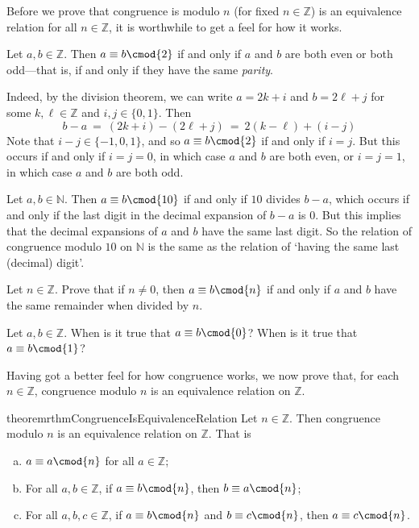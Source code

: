 Before we prove that congruence is modulo $n$ (for fixed $n \in \mathbb{Z}$) is an equivalence relation for all $n \in \mathbb{Z}$, it is worthwhile to get a feel for how it works.

\begin{example}
\label{exCongruenceModuloTwoIsSameAsParity}
Let $a,b \in \mathbb{Z}$. Then $a \equiv b \cmod{2}$ if and only if $a$ and $b$ are both even or both odd---that is, if and only if they have the same \textit{parity}.

Indeed, by the division theorem, we can write $a=2k+i$ and $b=2\ell+j$ for some $k,\ell \in \mathbb{Z}$ and $i,j \in \{ 0,1 \}$. Then
\[ b - a ~=~ (2k+i) - (2\ell+j) ~=~ 2(k-\ell) + (i-j) \]
Note that $i-j \in \{ {-1},0,1 \}$, and so $a \equiv b \cmod{2}$ if and only if $i=j$. But this occurs if and only if $i=j=0$, in which case $a$ and $b$ are both even, or $i=j=1$, in which case $a$ and $b$ are both odd.
\end{example}

\begin{example}
\label{exModuloTenIsSameAsLastDigit}
Let $a,b \in \mathbb{N}$. Then $a \equiv b \cmod{10}$ if and only if $10$ divides $b-a$, which occurs if and only if the last digit in the decimal expansion of $b-a$ is $0$. But this implies that the decimal expansions of $a$ and $b$ have the same last digit. So the relation of congruence modulo $10$ on $\mathbb{N}$ is the same as the relation of `having the same last (decimal) digit'.
\end{example}

\begin{exercise}
Let $n \in \mathbb{Z}$. Prove that if $n \ne 0$, then $a \equiv b \cmod{n}$ if and only if $a$ and $b$ have the same remainder when divided by $n$.
\end{exercise}

\begin{exercise}
Let $a,b \in \mathbb{Z}$. When is it true that $a \equiv b \cmod{0}$? When is it true that $a \equiv b \cmod{1}$?
\end{exercise}

Having got a better feel for how congruence works, we now prove that, for each $n \in \mathbb{Z}$, congruence modulo $n$ is an equivalence relation on $\mathbb{Z}$.

\begin{restatable}{theorem}{rthmCongruenceIsEquivalenceRelation}
\label{thmCongruenceIsEquivalenceRelation}
Let $n \in \mathbb{Z}$. Then congruence modulo $n$ is an equivalence relation on $\mathbb{Z}$. That is
\begin{enumerate}[(a)]
\item $a \equiv a \cmod{n}$ for all $a \in \mathbb{Z}$;
\item For all $a,b \in \mathbb{Z}$, if $a \equiv b \cmod{n}$, then $b \equiv a \cmod{n}$;
\item For all $a,b,c \in \mathbb{Z}$, if $a \equiv b \cmod{n}$ and $b \equiv c \cmod{n}$, then $a \equiv c \cmod{n}$.
\end{enumerate}
\end{restatable}

